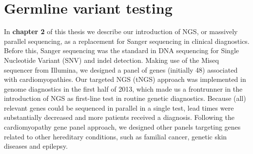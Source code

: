 \section{Germline variant testing} \label{Germline}
In \textbf{chapter 2} of this thesis we describe our introduction of NGS, or massively parallel sequencing, as a replacement for Sanger sequencing in clinical diagnostics. 
Before this, Sanger sequencing was the standard in DNA sequencing for Single Nucleotide Variant (SNV) and indel detection. 
Making use of the Miseq sequencer from Illumina, we designed a panel of genes (initially 48) associated with cardiomyopathies. 
Our targeted NGS (tNGS) approach was implemented in genome diagnostics in the first half of 2013, which made us a frontrunner in the introduction of NGS as first-line test in routine genetic diagnostics. Because (all) relevant genes could be sequenced in parallel in a single test, lead times were substantially decreased and more patients received a diagnosis. 
Following the cardiomyopathy gene panel approach, we designed other panels targeting genes related to other hereditary conditions, such as familial cancer, genetic skin diseases and epilepsy.

